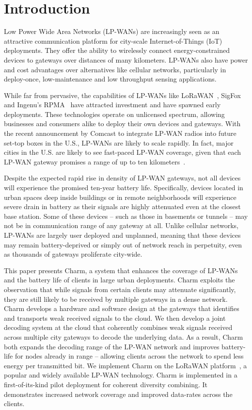 
\section{Introduction}
\label{sec:intro}

Low Power Wide Area Networks (LP-WANs) are increasingly seen as an attractive
communication platform for city-scale Internet-of-Things (IoT) deployments.
They offer the ability to wirelessly connect energy-constrained devices to
gateways over distances of many kilometers. LP-WANs also have power and cost
advantages over alternatives like cellular networks, particularly in
deploy-once, low-maintenance and low throughput sensing applications.

While far from pervasive, the capabilities of LP-WANs like
LoRaWAN~\cite{Sornin2015, LoRaWanAlliance2015}, SigFox~\cite{centenaro2016}
and Ingenu's RPMA~\cite{Ingenu2015} have attracted investment and have spawned
early deployments. These technologies operate on unlicensed spectrum, allowing
businesses and consumers alike to deploy their own devices and gateways. With
the recent announcement by Comcast \cite{comcast, comcast2} to integrate
LP-WAN radios into future set-top boxes in the U.S., LP-WANs are likely to
scale rapidly. In fact, major cities in the U.S. are likely to see fast-paced
LP-WAN coverage, given that each LP-WAN gateway promises a range of up to ten
kilometers~\cite{LoRaWanAlliance2015}.

Despite the expected rapid rise in density of LP-WAN gateways, not all
devices will experience the promised ten-year battery life. Specifically,
devices located in urban spaces deep inside buildings or in remote
neighborhoods will experience severe drain in battery as their signals are
highly attenuated even at the closest base station. Some of these devices --
such as those in basements or tunnels -- may not be in communication range of
any gateway at all. Unlike cellular networks, LP-WANs are largely user
deployed and unplanned, meaning that these devices may remain battery-deprived
or simply out of network reach in perpetuity, even as thousands of gateways
proliferate city-wide.

This paper presents Charm, a system that enhances the coverage of LP-WANs and
the battery life of clients in large urban deployments. Charm exploits the
observation that while signals from certain clients may attenuate
significantly, they are still likely to be received by multiple gateways in a
dense network. Charm develops a hardware and software design at the gateways
that identifies and transports weak received signals to the cloud. We then
develop a joint decoding system at the cloud that coherently combines weak
signals received across multiple city gateways to decode the underlying data.
As a result, Charm both expands the decoding range of the LP-WAN network and
improves battery-life for nodes already in range -- allowing clients across
the network to spend less energy per transmitted bit. We implement Charm on
the LoRaWAN platform~\cite{LoRaWanAlliance2015}, a popular and widely
available LP-WAN technology. Charm is implemented in a first-of-its-kind pilot
deployment for coherent diversity combining. It demonstrates increased
network coverage and improved data-rates across the clients.

